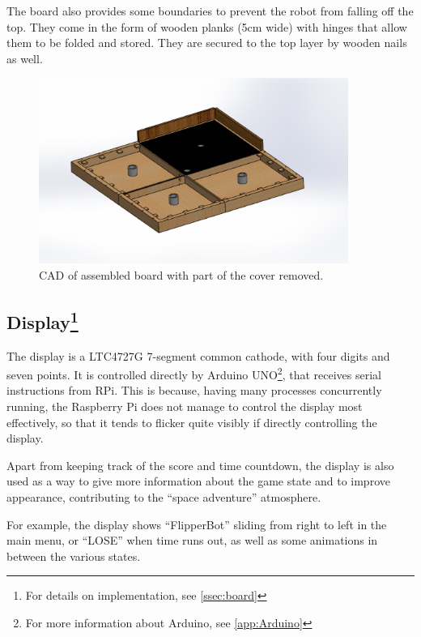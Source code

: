 \documentclass[a4paper,twoside]{book}
\begin{document}
The board also provides some boundaries to prevent the robot from falling off the top. They come in the form of wooden planks (5cm wide) with hinges that allow them to be folded and stored. They are secured to the top layer by wooden nails as well.

\begin{figure}[h]
\centering
\includegraphics[width=0.9\textwidth]{img/Board}
\caption{CAD of assembled board with part of the cover removed.}
\end{figure}

\subsection[Display]{Display\footnote{For details on implementation, see \autoref{ssec:board}}}
\label{ssec:display}

The display is a LTC4727G 7-segment common cathode, with four digits and seven points. It is controlled directly by Arduino UNO\footnote{For more information about Arduino, see \autoref{app:Arduino}}, that receives serial instructions from RPi. This is because, having many processes concurrently running, the Raspberry Pi does not manage to control the display most effectively, so that it tends to flicker quite visibly if directly controlling the display.

Apart from keeping track of the score and time countdown, the display is also used as a way to give more information about the game state and to improve appearance, contributing to the \textquotedblleft{}space adventure\textquotedblright{}  atmosphere.

For example, the display shows \textquotedblleft{}FlipperBot\textquotedblright{}  sliding from right to left in the main menu, or \textquotedblleft{}LOSE\textquotedblright{}  when time runs out, as well as some animations in between the various states.
\end{document}

